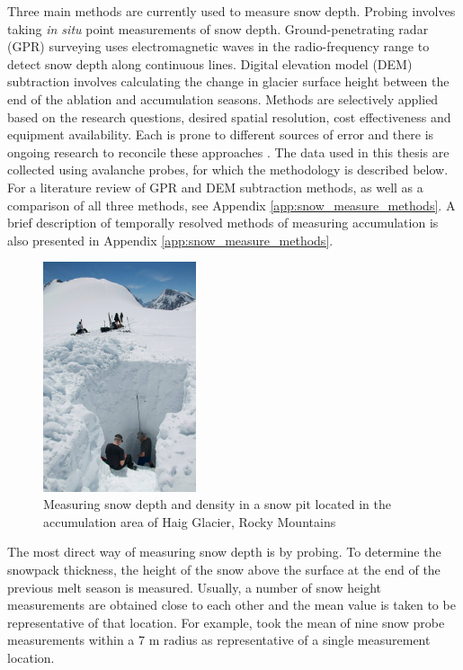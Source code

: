 \documentclass{sfuthesis}
\begin{document}
Three main methods are currently used to measure snow depth. Probing involves taking \textit{in situ} point measurements of snow depth. Ground-penetrating radar (GPR) surveying uses electromagnetic waves in the radio-frequency range to detect snow depth along continuous lines. Digital elevation model (DEM) subtraction involves calculating the change in glacier surface height between the end of the ablation and accumulation seasons. Methods are selectively applied based on the research questions, desired spatial resolution, cost effectiveness and equipment availability. Each is prone to different sources of error and there is ongoing research to reconcile these approaches \citep{Sold2014}. The data used in this thesis are collected using avalanche probes, for which the methodology is described below. For a literature review of GPR and DEM subtraction methods, as well as a comparison of all three methods, see Appendix \ref{app:snow_measure_methods}. A brief description of temporally resolved methods of measuring accumulation is also presented in Appendix \ref{app:snow_measure_methods}.

\label{snowprobing}
\begin{figure}[t]
 \centering
      \includegraphics[width=0.4\textwidth]{snowpit.jpg}
 \caption{Measuring snow depth and density in a snow pit located in the accumulation area of Haig Glacier, Rocky Mountains}
        \label{snowpit}
\end{figure}

The most direct way of measuring snow depth is by probing. To determine the snowpack thickness, the height of the snow above the surface at the end of the previous melt season is measured. Usually, a number of snow height measurements are obtained close to each other and the mean value is taken to be representative of that location. For example, \cite{Machguth2006} took the mean of nine snow probe measurements within a 7 m radius as representative of a single measurement location.  
\end{document}
